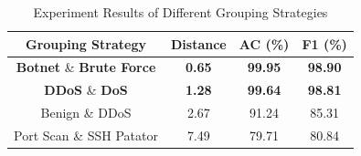 \begin{table}[htbp]
	\centering
	\caption{Experiment Results of Different Grouping Strategies}		
	\label{tab:group_experiment}
	    \begin{tabular}{|c|c|c|c|}
	    \hline
	    Grouping Strategy & Distance & AC (\%) & F1 (\%) \\
	    \hline
	    \textbf{Botnet} \& \textbf{Brute Force} & \textbf{0.65} & \textbf{99.95} & \textbf{98.90} \\
	    \textbf{DDoS} \& \textbf{DoS} & \textbf{1.28} & \textbf{99.64} & \textbf{98.81} \\
	    \hline
	    Benign \& DDoS & 2.67 & 91.24 & 85.31 \\
           Port Scan \& SSH Patator & 7.49 & 79.71 & 80.84 \\
	    \hline
	    \end{tabular}
\end{table}